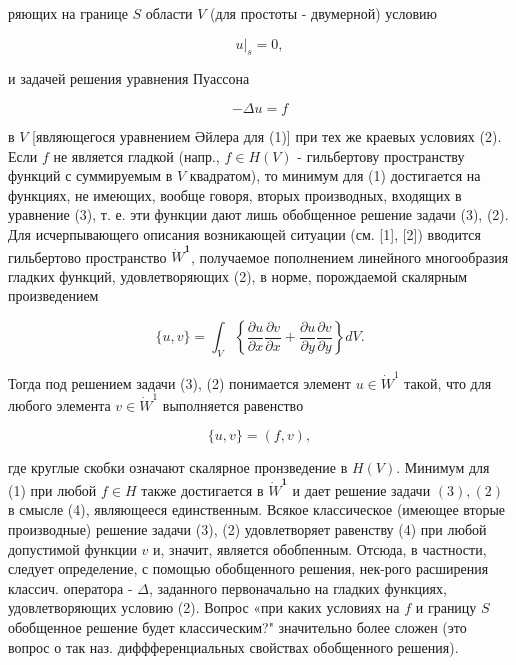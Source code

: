\documentclass[10pt]{article}
\begin{document}
ряющих на границе $S$ области $V$ (для простоты - двумерной) условию



\[

\left.u\right|_{s}=0,

\]



и задачей решения уравнения Пуассона



\[

-\Delta u=f

\]



в $V$ [являющегося уравнением Әйлера для (1)] при тех же краевых условиях (2). Если $f$ не является гладкой (напр., $f \in H(V)$ - гильбертову пространству функций с суммируемым в $V$ квадратом), то минимум для (1) достигается на функциях, не имеющих, вообще говоря, вторых производных, входящих в уравнение (3), т. е. эти функции дают лишь обобщенное решение задачи (3), (2). Для исчерпывающего описания возникающей ситуации (см. [1], [2]) вводится гильбертово пространство $\dot{W}^{\mathbf{1}}$, получаемое пополнением линейного многообразия гладких функций, удовлетворяющих (2), в норме, порождаемой скалярным произведением



\[

\{u, v\}=\int_{V}\left\{\frac{\partial u}{\partial x} \frac{\partial v}{\partial x}+\frac{\partial u}{\partial y} \frac{\partial v}{\partial y}\right\} d V .

\]



Тогда под решением задачи (3), (2) понимается элемент $u \in \dot{W}^{1}$ такой, что для любого элемента $v \in \dot{W}^{1}$ выполняется равенство



\[

\{u, v\}=(f, v),

\]



где круглые скобки означают скалярное пронзведение в $H(V)$. Минимум для (1) при любой $f \in H$ также достигается в $\dot{W}^{\mathbf{1}}$ и дает решение задачи $(3),(2)$ в смысле (4), являющееся единственным. Всякое классическое (имеющее вторые производные) решение задачи (3), (2) удовлетворяет равенству (4) при любой допустимой функции $v$ и, значит, является обобпенным. Отсюда, в частности, следует определение, с помощью обобщенного решения, нек-рого расширения классич. оператора - $\Delta$, заданного первоначально на гладких функциях, удовлетворяющих условию (2). Вопрос «при каких условиях на $f$ и границу $S$ обобщенное решение будет классическим?" значительно более сложен (это вопрос о так наз. диффференциальных свойствах обобщенного решения).
\end{document}
